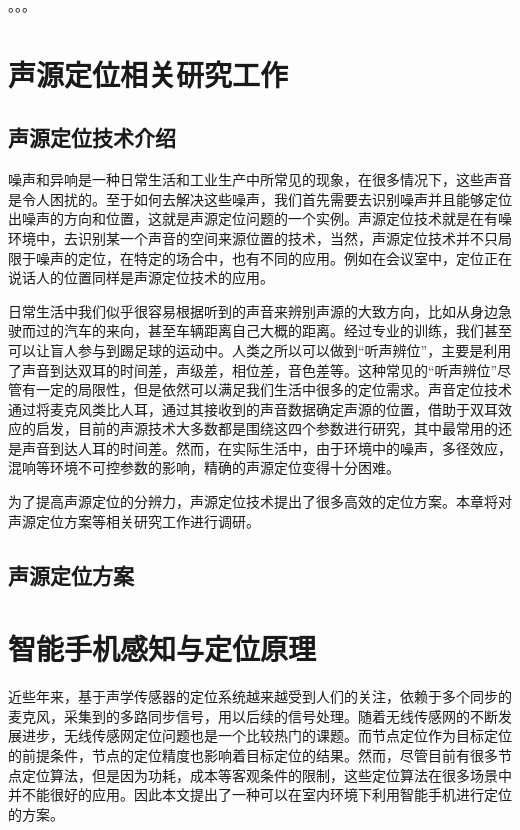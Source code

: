 \documentclass[winfonts]{njuthesis}
\begin{document}
		。。。

\chapter{声源定位相关研究工作}
	\section{声源定位技术介绍}
		
		噪声和异响是一种日常生活和工业生产中所常见的现象，在很多情况下，这些声音是令人困扰的。至于如何去解决这些噪声，我们首先需要去识别噪声并且能够定位出噪声的方向和位置，这就是声源定位问题的一个实例。声源定位技术就是在有噪环境中，去识别某一个声音的空间来源位置的技术，当然，声源定位技术并不只局限于噪声的定位，在特定的场合中，也有不同的应用。例如在会议室中，定位正在说话人的位置同样是声源定位技术的应用。
		
		日常生活中我们似乎很容易根据听到的声音来辨别声源的大致方向，比如从身边急驶而过的汽车的来向，甚至车辆距离自己大概的距离。经过专业的训练，我们甚至可以让盲人参与到踢足球的运动中。人类之所以可以做到“听声辨位”，主要是利用了声音到达双耳的时间差，声级差，相位差，音色差等。这种常见的“听声辨位”尽管有一定的局限性，但是依然可以满足我们生活中很多的定位需求。声音定位技术通过将麦克风类比人耳，通过其接收到的声音数据确定声源的位置，借助于双耳效应的启发，目前的声源技术大多数都是围绕这四个参数进行研究，其中最常用的还是声音到达人耳的时间差。然而，在实际生活中，由于环境中的噪声，多径效应，混响等环境不可控参数的影响，精确的声源定位变得十分困难。
		
		为了提高声源定位的分辨力，声源定位技术提出了很多高效的定位方案。本章将对声源定位方案等相关研究工作进行调研。
		
	\section{声源定位方案}
	
		


\chapter{智能手机感知与定位原理}\label{chapter_mobile}
	
	近些年来，基于声学传感器的定位系统越来越受到人们的关注，依赖于多个同步的麦克风，采集到的多路同步信号，用以后续的信号处理。随着无线传感网的不断发展进步，无线传感网定位问题也是一个比较热门的课题。而节点定位作为目标定位的前提条件，节点的定位精度也影响着目标定位的结果。然而，尽管目前有很多节点定位算法，但是因为功耗，成本等客观条件的限制，这些定位算法在很多场景中并不能很好的应用。因此本文提出了一种可以在室内环境下利用智能手机进行定位的方案。
	
\end{document}
